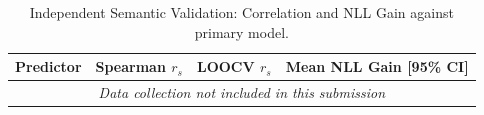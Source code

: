 \begin{table}[htbp]
\centering
\caption{Independent Semantic Validation: Correlation and NLL Gain against primary model.}
\label{tab:independent-validation}
\begin{tabular}{lccc}
\toprule
Predictor & Spearman $r_s$ & LOOCV $r_s$ & Mean NLL Gain [95\% CI] \\
\midrule
\multicolumn{4}{c}{\textit{Data collection not included in this submission}} \\
\bottomrule
\end{tabular}
\end{table}

